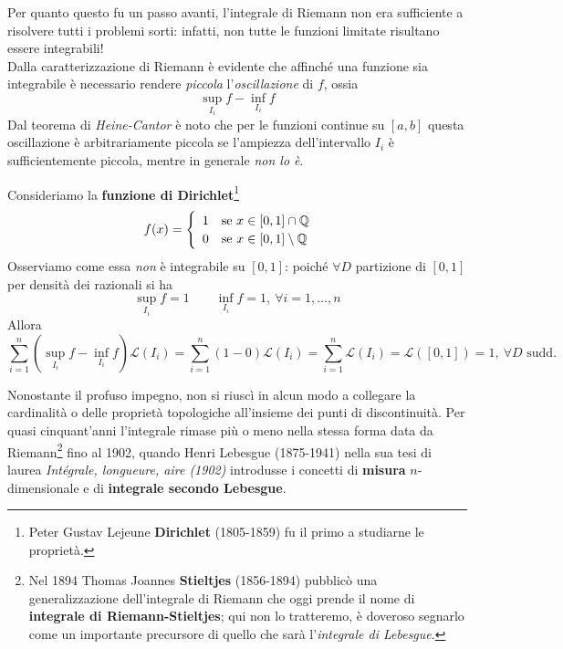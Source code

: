Per quanto questo fu un passo avanti, l'integrale di Riemann non era sufficiente a risolvere tutti i problemi sorti: infatti, non tutte le funzioni limitate risultano essere integrabili!\\
Dalla caratterizzazione di Riemann è evidente che affinché una funzione sia integrabile è necessario rendere \textit{piccola} l’\textit{oscillazione} di $f$, ossia
\begin{equation*}
	\sup_{I_i}f-\inf_{I_i}f
\end{equation*}
Dal teorema di \textit{Heine-Cantor} è noto che per le funzioni continue su $\left[a,b\right]$ questa oscillazione è arbitrariamente piccola se l’ampiezza dell’intervallo $I_i$ è
sufficientemente piccola, mentre in generale \textit{non lo è}.
\begin{examplewt}\label{funzionedirichlet}
	Consideriamo la \textbf{funzione di Dirichlet}\footnote{Peter Gustav Lejeune \textbf{Dirichlet} (1805-1859) fu il primo a studiarne le proprietà.}
	\begin{equation}
		f(x)=
		\begin{cases}
			\begin{array}{ll}
				1&\text{se }x\in\left[0,1\right]\cap\mathbb{Q}\\
				0&\text{se }x\in\left[0,1\right]\setminus\mathbb{Q}\\
			\end{array}
		\end{cases}
	\end{equation}
Osserviamo come essa \textit{non} è integrabile su $\left[0,1\right]$: poiché $\forall D$ partizione di $\left[0,1\right]$ per densità dei razionali si ha
\begin{equation*}
	\sup_{I_i}f=1\qquad	\inf_{I_i}f=1,\ \forall i=1,\ldots,n
\end{equation*}
Allora
\begin{equation*}
	\sum_{i=1}^{n}\left(\sup_{I_i}f-\inf_{I_i}f\right)\mathcal{L}\left(I_i\right)=\sum_{i=1}^{n}\left(1-0\right)\mathcal{L}\left(I_i\right)=\sum_{i=1}^{n}\mathcal{L}\left(I_i\right)=\mathcal{L}\left(\left[0,1\right]\right)=1,\ \forall D\text{ sudd.}
\end{equation*}
\end{examplewt}
Nonostante il profuso impegno, non si riuscì in alcun modo a collegare la cardinalità o delle proprietà topologiche all'insieme dei punti di discontinuità. Per quasi cinquant'anni l'integrale rimase più o meno nella stessa forma data da Riemann\footnote{Nel 1894 Thomas Joannes \textbf{Stieltjes} (1856-1894) pubblicò una generalizzazione dell'integrale di Riemann che oggi prende il nome di \textbf{integrale di Riemann-Stieltjes}; qui non lo tratteremo, è doveroso segnarlo come un importante precursore di quello che sarà l'\textit{integrale di Lebesgue}.} fino al 1902, quando Henri Lebesgue (1875-1941) nella sua tesi di laurea \textit{Intégrale, longueure, aire (1902)} introdusse i concetti di \textbf{misura} $n$-dimensionale e di \textbf{integrale secondo Lebesgue}.\\
